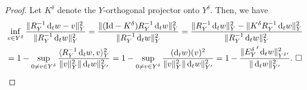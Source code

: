 \documentclass[10pt,a4paper]{amsart}
\newcommand*\diff{\mathop{}\!\mathrm{d}}
\newcommand{\identity}{\mathrm{Id}}
\begin{document}
\begin{proof}
Let  $K^\delta$ denote the $Y$-orthogonal projector onto $Y^\delta$. Then, we have
\begin{align*}
&\inf_{v \in Y^\delta} \frac{\|R_Y^{-1}\diff_t  w  -v\|^2_Y}{\|R_Y^{-1}\diff_t  w\|^2_Y}=
\frac{\|(\identity -K^\delta)R_Y^{-1}\diff_t  w \|^2_Y}{\|R_Y^{-1}\diff_t  w\|^2_Y}=
\frac{\|R_Y^{-1}\diff_t  w \|^2_Y-\|K^\delta R_Y^{-1}\diff_t  w\|^2_Y}{\|R_Y^{-1}\diff_t  w\|^2_Y}\\
&=1-\sup_{0 \neq v \in Y^\delta} \frac{\langle R_Y^{-1}\diff_t  w,v\rangle_Y^2}{\|v\|^2_Y \|\diff_t  w\|^2_{Y'}}=
1-\sup_{0 \neq v \in Y^\delta} \frac{(\diff_t  w)(v)^2}{\|v\|^2_Y \|\diff_t  w\|^2_{Y'}}=
1-\frac{\|{E_Y^\delta}'\diff_t  w\|^2_{{Y^\delta}'}}{\|\diff_t  w\|^2_{Y'}}.\,\,\Box\mbox{$\qedhere$}
\end{align*}
\end{proof}
\end{document}
